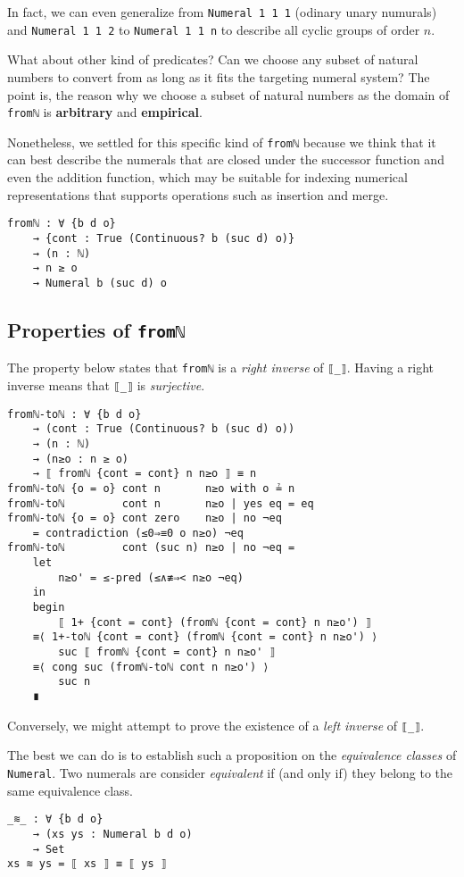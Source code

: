 \documentclass[\main/thesis.tex]{subfiles}
\begin{document}
In fact, we can even generalize from \lstinline|Numeral 1 1 1|
(odinary unary numurals) and \lstinline|Numeral 1 1 2| to \lstinline|Numeral 1 1 n|
to describe all cyclic groups of order $ n $.

What about other kind of predicates? Can we choose any subset of natural numbers
to convert from as long as it fits the targeting numeral system?
The point is, the reason why we choose a subset of natural numbers as the domain
of \lstinline|fromℕ| is \textbf{arbitrary} and \textbf{empirical}.

Nonetheless, we settled for this specific kind of \lstinline|fromℕ| because we
think that it can best describe the numerals that are closed under the successor
function and even the addition function, which may be suitable for indexing
numerical representations that supports operations such as insertion and merge.

\begin{lstlisting}
fromℕ : ∀ {b d o}
    → {cont : True (Continuous? b (suc d) o)}
    → (n : ℕ)
    → n ≥ o
    → Numeral b (suc d) o
\end{lstlisting}

\subsection{Properties of \lstinline|fromℕ|}

The property below states that \lstinline|fromℕ| is a \textit{right inverse} of
\lstinline|⟦_⟧|. Having a right inverse means that \lstinline|⟦_⟧| is
\textit{surjective}.

\begin{lstlisting}
fromℕ-toℕ : ∀ {b d o}
    → (cont : True (Continuous? b (suc d) o))
    → (n : ℕ)
    → (n≥o : n ≥ o)
    → ⟦ fromℕ {cont = cont} n n≥o ⟧ ≡ n
fromℕ-toℕ {o = o} cont n       n≥o with o ≟ n
fromℕ-toℕ         cont n       n≥o | yes eq = eq
fromℕ-toℕ {o = o} cont zero    n≥o | no ¬eq
    = contradiction (≤0⇒≡0 o n≥o) ¬eq
fromℕ-toℕ         cont (suc n) n≥o | no ¬eq =
    let
        n≥o' = ≤-pred (≤∧≢⇒< n≥o ¬eq)
    in
    begin
        ⟦ 1+ {cont = cont} (fromℕ {cont = cont} n n≥o') ⟧
    ≡⟨ 1+-toℕ {cont = cont} (fromℕ {cont = cont} n n≥o') ⟩
        suc ⟦ fromℕ {cont = cont} n n≥o' ⟧
    ≡⟨ cong suc (fromℕ-toℕ cont n n≥o') ⟩
        suc n
    ∎
\end{lstlisting}

Conversely, we might attempt to prove the existence of a \textit{left inverse}
of \lstinline|⟦_⟧|.


The best we can do is to establish such a proposition on the
\textit{equivalence classes} of \lstinline|Numeral|. Two numerals are consider
\textit{equivalent} if (and only if) they belong to the same equivalence class.

\begin{lstlisting}
_≋_ : ∀ {b d o}
    → (xs ys : Numeral b d o)
    → Set
xs ≋ ys = ⟦ xs ⟧ ≡ ⟦ ys ⟧
\end{lstlisting}
\end{document}
